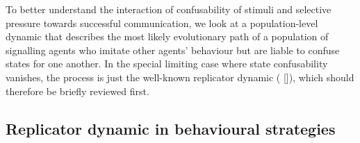 \documentclass[12pt,english]{article}
\numberwithin{equation}{section}
\newcommand{\citepbjps}[1]{(\citeauthor{#1} [\citeyear{#1}])}
\begin{document}
To better understand the interaction of confusability of stimuli and selective pressure towards
successful communication, we look at a population-level dynamic that describes the most likely
evolutionary path of a population of signalling agents who imitate other agents' behaviour but
are liable to confuse states for one another. In the special limiting case where state
confusability vanishes, the process is just the well-known replicator dynamic
\citepbjps{TaylorJonker1978:Evolutionary-St}, which should therefore be briefly reviewed first.


\subsection{Replicator dynamic in behavioural strategies}
\label{sec:repl-dynam-behav}
\end{document}
